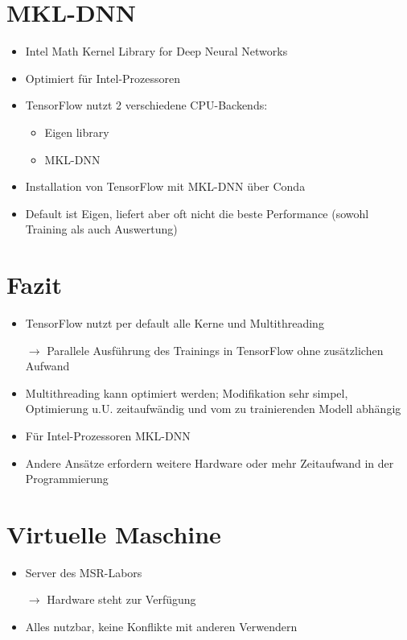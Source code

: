 \begin{fiugre}
\begin{fiugre}
{\begin{fiugre}
\section{MKL-DNN}

\begin{itemize}
  \item Intel Math Kernel Library for Deep Neural Networks
  \item Optimiert für Intel-Prozessoren 
  \item TensorFlow nutzt 2 verschiedene CPU-Backends:
    \begin{itemize}
      \item Eigen library
      \item MKL-DNN
    \end{itemize}
  \item Installation von TensorFlow mit MKL-DNN über Conda
  \item Default ist Eigen, liefert aber oft nicht die beste Performance (sowohl Training als auch Auswertung) 
\end{itemize}

\section{Fazit}

\begin{itemize}
  \item TensorFlow nutzt per default alle Kerne und Multithreading
  
        $\rightarrow$ Parallele Ausführung des Trainings in TensorFlow ohne zusätzlichen Aufwand
  \item Multithreading kann optimiert werden; Modifikation sehr simpel, Optimierung u.U. zeitaufwändig und vom zu trainierenden Modell abhängig
  \item Für Intel-Prozessoren MKL-DNN
  \item Andere Ansätze erfordern weitere Hardware oder mehr Zeitaufwand in der Programmierung
\end{itemize}

\section{Virtuelle Maschine}

\begin{itemize}
  \item Server des MSR-Labors
     
        $\rightarrow$ Hardware steht zur Verfügung
  \item Alles nutzbar, keine Konflikte mit anderen Verwendern
\end{itemize}


\end{fiugre}}
\end{fiugre}
\end{fiugre}
